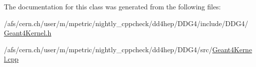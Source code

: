 The documentation for this class was generated from the following files:\begin{DoxyCompactItemize}
\item 
/afs/cern.ch/user/m/mpetric/nightly\_\-cppcheck/dd4hep/DDG4/include/DDG4/\hyperlink{_geant4_kernel_8h}{Geant4Kernel.h}\item 
/afs/cern.ch/user/m/mpetric/nightly\_\-cppcheck/dd4hep/DDG4/src/\hyperlink{_geant4_kernel_8cpp}{Geant4Kernel.cpp}\end{DoxyCompactItemize}

